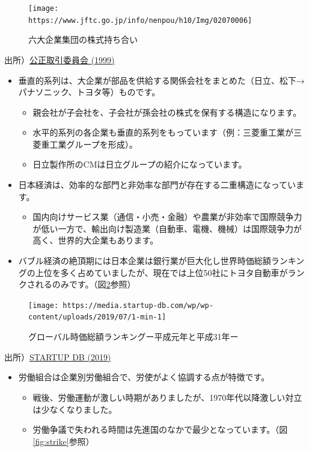 \documentclass[
]{book}
\providecommand{\tightlist}{%
  \setlength{\itemsep}{0pt}\setlength{\parskip}{0pt}}
\begin{document}
\begin{figure}
\texttt{[image: https://www.jftc.go.jp/info/nenpou/h10/Img/02070006]} \caption{六大企業集団の株式持ち合い}\label{fig:bigsix2}
\end{figure}

出所）\href{https://www.jftc.go.jp/info/nenpou/h10/02070001.html}{公正取引委員会 (1999)}

\begin{itemize}
\item
  垂直的系列は、大企業が部品を供給する関係会社をまとめた（日立、松下→パナソニック、トヨタ等）ものです。

  \begin{itemize}
  \item
    親会社が子会社を、子会社が孫会社の株式を保有する構造になります。
  \item
    水平的系列の各企業も垂直的系列をもっています（例：三菱重工業が三菱重工業グループを形成）。
  \item
    日立製作所のCMは日立グループの紹介になっています。
  \end{itemize}
\end{itemize}

\begin{itemize}
\item
  日本経済は、効率的な部門と非効率な部門が存在する二重構造になっています。

  \begin{itemize}
  \tightlist
  \item
    国内向けサービス業（通信・小売・金融）や農業が非効率で国際競争力が低い一方で、輸出向け製造業（自動車、電機、機械）は国際競争力が高く、世界的大企業もあります。
  \end{itemize}
\item
  バブル経済の絶頂期には日本企業は銀行業が巨大化し世界時価総額ランキングの上位を多く占めていましたが、現在では上位50社にトヨタ自動車がランクされるのみです。（図\ref{fig:value}参照）
\end{itemize}

\begin{figure}
\texttt{[image: https://media.startup-db.com/wp/wp-content/uploads/2019/07/1-min-1]} \caption{グローバル時価総額ランキングー平成元年と平成31年ー}\label{fig:value}
\end{figure}

出所）\href{https://media.startup-db.com/research/marketcap-global}{STARTUP DB (2019)}

\begin{itemize}
\item
  労働組合は企業別労働組合で、労使がよく協調する点が特徴です。

  \begin{itemize}
  \item
    戦後、労働運動が激しい時期がありましたが、1970年代以降激しい対立は少なくなりました。
  \item
    労働争議で失われる時間は先進国のなかで最少となっています。（図\ref{fig:strike}参照）
  \end{itemize}
\end{itemize}
\end{document}
